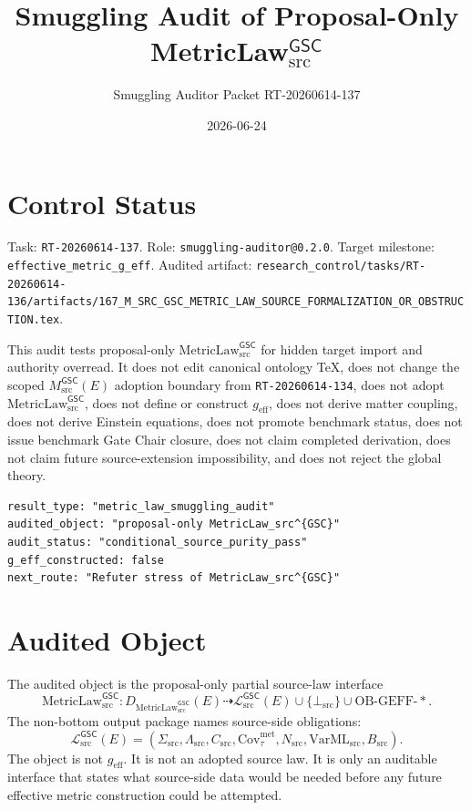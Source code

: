 \documentclass[11pt]{article}
\title{Smuggling Audit of Proposal-Only MetricLaw\(_{\mathrm{src}}^{\mathsf{GSC}}\)}
\author{Smuggling Auditor Packet RT-20260614-137}
\date{2026-06-24}
\newcommand{\MsrcGSC}{M_{\mathrm{src}}^{\mathsf{GSC}}}
\newcommand{\MetricLaw}{\mathrm{MetricLaw}_{\mathrm{src}}^{\mathsf{GSC}}}
\newcommand{\MetricData}{\mathcal{L}_{\mathrm{src}}^{\mathsf{GSC}}}
\newcommand{\BottomSrc}{\bot_{\mathrm{src}}}
\newcommand{\geff}{g_{\mathrm{eff}}}
\begin{document}
\maketitle

\section{Control Status}

Task: \texttt{RT-20260614-137}. Role:
\texttt{smuggling-auditor@0.2.0}. Target milestone:
\texttt{effective\_metric\_g\_eff}. Audited artifact:
\texttt{research\_control/tasks/RT-20260614-136/artifacts/167\_M\_SRC\_GSC\_METRIC\_LAW\_SOURCE\_FORMALIZATION\_OR\_OBSTRUCTION.tex}.

This audit tests proposal-only \(\MetricLaw\) for hidden target import and
authority overread. It does not edit canonical ontology TeX, does not change
the scoped \(\MsrcGSC(E)\) adoption boundary from \texttt{RT-20260614-134},
does not adopt \(\MetricLaw\), does not define or construct \(\geff\), does
not derive matter coupling, does not derive Einstein equations, does not
promote benchmark status, does not issue benchmark Gate Chair closure, does
not claim completed derivation, does not claim future source-extension
impossibility, and does not reject the global theory.

\begin{verbatim}
result_type: "metric_law_smuggling_audit"
audited_object: "proposal-only MetricLaw_src^{GSC}"
audit_status: "conditional_source_purity_pass"
g_eff_constructed: false
next_route: "Refuter stress of MetricLaw_src^{GSC}"
\end{verbatim}

\section{Audited Object}

The audited object is the proposal-only partial source-law interface
\[
  \MetricLaw:
  D_{\MetricLaw}(E)
  \dashrightarrow
  \MetricData(E)
  \cup
  \{\BottomSrc\}
  \cup
  \mathrm{OB\mbox{-}GEFF\mbox{-}*}.
\]
The non-bottom output package names source-side obligations:
\[
  \MetricData(E)
  =
  (
    \Sigma_{\mathrm{src}},
    \Lambda_{\mathrm{src}},
    C_{\mathrm{src}},
    \mathrm{Cov}_{\tau}^{\mathrm{met}},
    N_{\mathrm{src}},
    \mathrm{VarML}_{\mathrm{src}},
    B_{\mathrm{src}}
  ).
\]
The object is not \(\geff\). It is not an adopted source law. It is only an
auditable interface that states what source-side data would be needed before
any future effective metric construction could be attempted.
\end{document}

